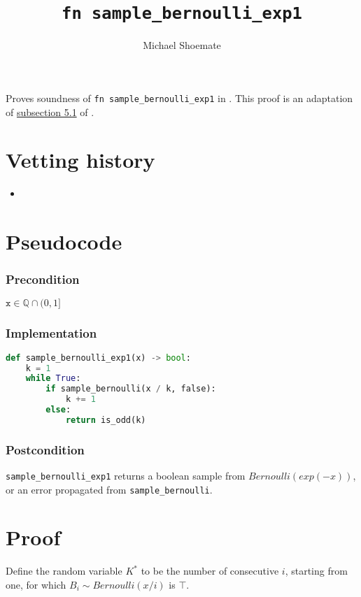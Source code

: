 \documentclass{article}
\title{\texttt{fn sample\_bernoulli\_exp1}}
\author{Michael Shoemate}
\begin{document}
\maketitle

\contrib
Proves soundness of \texttt{fn sample\_bernoulli\_exp1} in .
This proof is an adaptation of \href{https://arxiv.org/pdf/2004.00010.pdf#subsection.5.1}{subsection 5.1} of \cite{CKS20}.

\section{Vetting history}
\begin{itemize}
    \item {}
\end{itemize}

\section{Pseudocode}
\subsubsection*{Precondition}
$\texttt{x} \in \mathbb{Q} \cap (0, 1]$

\subsubsection*{Implementation}        
\begin{lstlisting}[language=Python]
def sample_bernoulli_exp1(x) -> bool:
    k = 1
    while True:
        if sample_bernoulli(x / k, false):
            k += 1
        else: 
            return is_odd(k)
\end{lstlisting}

\subsubsection*{Postcondition}
\texttt{sample\_bernoulli\_exp1} returns a boolean sample from $Bernoulli(exp(-x))$, or an error propagated from \texttt{sample\_bernoulli}.

\section{Proof}

Define the random variable $K^{*}$ to be the number of consecutive $i$, starting from one, for which $B_i \sim Bernoulli(x/i)$ is $\top$.
\end{document}
